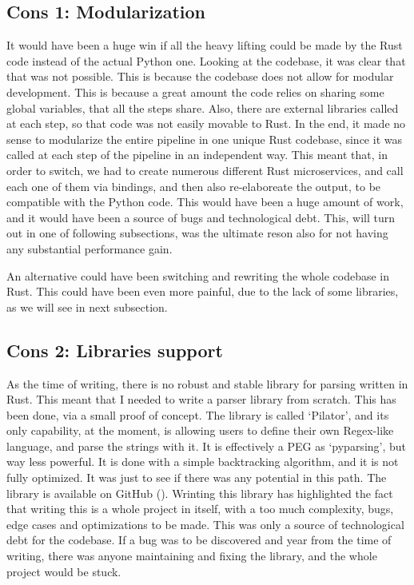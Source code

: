 \subsection[Modularization]{Cons 1: Modularization}
It would have been a huge win if all the heavy lifting could be made by the Rust
code instead of the actual Python one. Looking at the codebase, it was clear
that that was not possible. This is because the codebase does not allow for modular
development. This is because a great amount the code relies on sharing some
global variables, that all the steps share. Also, there are external libraries called
at each step, so that code was not easily movable to Rust. In the end, it made
no sense to modularize the entire pipeline in one unique Rust codebase, since it
was called at each step of the pipeline in an independent way. This meant that, in
order to switch, we had to create numerous different Rust microservices, and call
each one of them via bindings, and then also re-elaboreate the output, to be compatible
with the Python code. This would have been a huge amount of work, and it would have
been a source of bugs and technological debt. This, will turn out in one of following
subsections, was the ultimate reson also for not having any substantial
performance gain.

An alternative could have been switching and rewriting the whole codebase in
Rust. This could have been even more painful, due to the lack of some libraries,
as we will see in next subsection.

\subsection[Libraries support]{Cons 2: Libraries support}
As the time of writing, there is no robust and stable library for parsing
written in Rust. This meant that I needed to write a parser library from scratch.
This has been done, via a small proof of concept. The library is called `Pilator',
and its only capability, at the moment, is allowing users to define their own Regex-like
language, and parse the strings with it. It is effectively a PEG as `pyparsing',
but way less powerful. It is done with a simple backtracking algorithm, and it
is not fully optimized. It was just to see if there was any potential in this path.
The library is available on GitHub (\cite{pilator}). Wrinting this library has highlighted
the fact that writing this is a whole project in itself, with a too much
complexity, bugs, edge cases and optimizations to be made. This was only a source
of technological debt for the codebase. If a bug was to be discovered and year
from the time of writing, there was anyone maintaining and fixing the library,
and the whole project would be stuck.

